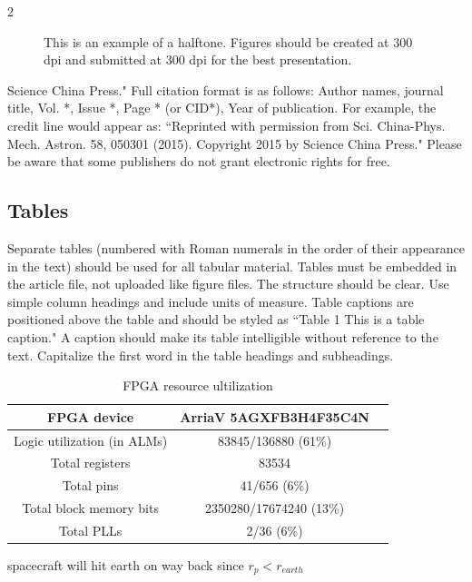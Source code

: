 \documentclass[fleqn]{2026SCGE}
\begin{document}
\begin{multicols}{2}
\begin{figure}[H]%
\centering
\caption{This is an example of a halftone. Figures should be created at 300 dpi and submitted at 300 dpi for the best presentation.} %
\label{fig:example5}%
\end{figure}


\noindent Science China Press." Full citation format is as follows: Author names, journal title, Vol. *, Issue *, Page * (or CID*), Year of publication. For example, the credit line would appear as: ``Reprinted with permission from Sci. China-Phys. Mech. Astron. 58, 050301 (2015). Copyright 2015 by Science China Press." Please be aware that some publishers do not grant electronic rights for free.


\subsection{Tables}
Separate tables (numbered with Roman numerals in the order of their appearance in the text) should be used for all tabular material. Tables must be embedded in the article file, not uploaded like figure files. The structure should be clear. Use simple column headings and include units of measure.  Table captions are positioned above the table and should be styled as ``Table 1  This is a table caption." A caption should make its table intelligible without reference to the text. Capitalize the first word in the table headings and subheadings.


\begin{table}[H]
\footnotesize
\begin{threeparttable}\caption{FPGA resource ultilization}\label{tab1}
	\doublerulesep 0.1pt \tabcolsep 13pt %
	\begin{tabular}{ccc}
		\toprule
		FPGA device & ArriaV 5AGXFB3H4F35C4N \\\hline
		Logic utilization (in ALMs) & 83845/136880 (61\%)\\
		Total registers & 83534\\
		Total pins & 41/656 (6\%)\\
		Total block memory bits&2350280/17674240 (13\%)\\
		Total PLLs&2/36 (6\%)\tnote{1)}\\
		\bottomrule
	\end{tabular}\begin{tablenotes}
		\item[1)] spacecraft will hit earth on way back since $r_p<r_{earth}$
\end{tablenotes}\end{threeparttable}
\end{table}


\end{multicols}
\end{document}
